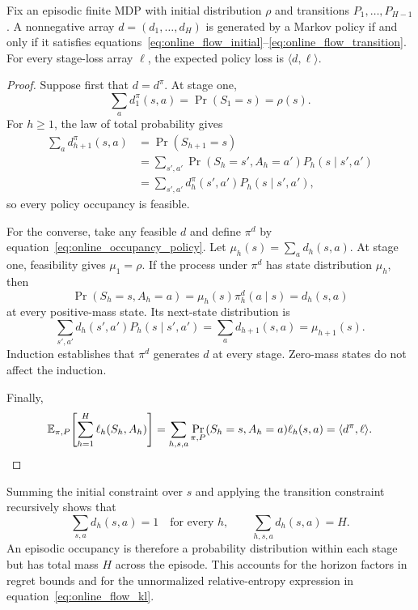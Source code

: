 \begin{theorem}
Fix an episodic finite MDP with initial distribution $\rho$ and transitions $P_1,\ldots,P_{H-1}$. A nonnegative array $d=(d_1,\ldots,d_H)$ is generated by a Markov policy if and only if it satisfies equations~\eqref{eq:online_flow_initial}--\eqref{eq:online_flow_transition}. For every stage-loss array $\ell$, the expected policy loss is $\langle d,\ell\rangle$.
\label{thm:online_occupancy_correspondence}
\end{theorem}

\begin{proof}
Suppose first that $d=d^\pi$. At stage one,
\[
\sum_a d_1^\pi(s,a)
=
\Pr(S_1=s)
=\rho(s).
\]
For $h\geq1$, the law of total probability gives
\begin{align*}
\sum_a d_{h+1}^\pi(s,a)
&=\Pr(S_{h+1}=s)\\
&=\sum_{s',a'}
\Pr(S_h=s',A_h=a')P_h(s\mid s',a')\\
&=\sum_{s',a'}d_h^\pi(s',a')P_h(s\mid s',a'),
\end{align*}
so every policy occupancy is feasible.

For the converse, take any feasible $d$ and define $\pi^d$ by equation~\eqref{eq:online_occupancy_policy}. Let $\mu_h(s)=\sum_a d_h(s,a)$. At stage one, feasibility gives $\mu_1=\rho$. If the process under $\pi^d$ has state distribution $\mu_h$, then
\[
\Pr(S_h=s,A_h=a)
=
\mu_h(s)\pi_h^d(a\mid s)
=d_h(s,a)
\]
at every positive-mass state. Its next-state distribution is
\[
\sum_{s',a'}d_h(s',a')P_h(s\mid s',a')
=
\sum_a d_{h+1}(s,a)
=\mu_{h+1}(s).
\]
Induction establishes that $\pi^d$ generates $d$ at every stage. Zero-mass states do not affect the induction.

Finally,
\[
\mathbb E_{\pi,P}\!\left[\sum_{h=1}^H\ell_h(S_h,A_h)\right]
=
\sum_{h,s,a}\Pr_{\pi,P}(S_h=s,A_h=a)\ell_h(s,a)
=\langle d^\pi,\ell\rangle.\qedhere
\]
\end{proof}

Summing the initial constraint over $s$ and applying the transition constraint recursively shows that
\begin{equation}
\sum_{s,a}d_h(s,a)=1
\quad\text{for every }h,
\qquad
\sum_{h,s,a}d_h(s,a)=H.
\label{eq:online_occupancy_mass}
\end{equation}
An episodic occupancy is therefore a probability distribution within each stage but has total mass $H$ across the episode. This accounts for the horizon factors in regret bounds and for the unnormalized relative-entropy expression in equation~\eqref{eq:online_flow_kl}.


